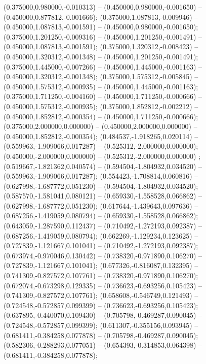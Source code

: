  (0.375000,0.980000,-0.010313) -- (0.450000,0.980000,-0.001650) -- (0.450000,0.877812,-0.001666);
 (0.375000,1.087813,-0.009946) -- (0.450000,1.087813,-0.001591) -- (0.450000,0.980000,-0.001650);
 (0.375000,1.201250,-0.009316) -- (0.450000,1.201250,-0.001491) -- (0.450000,1.087813,-0.001591);
 (0.375000,1.320312,-0.008423) -- (0.450000,1.320312,-0.001348) -- (0.450000,1.201250,-0.001491);
 (0.375000,1.445000,-0.007266) -- (0.450000,1.445000,-0.001163) -- (0.450000,1.320312,-0.001348);
 (0.375000,1.575312,-0.005845) -- (0.450000,1.575312,-0.000935) -- (0.450000,1.445000,-0.001163);
 (0.375000,1.711250,-0.004160) -- (0.450000,1.711250,-0.000666) -- (0.450000,1.575312,-0.000935);
 (0.375000,1.852812,-0.002212) -- (0.450000,1.852812,-0.000354) -- (0.450000,1.711250,-0.000666);
 (0.375000,2.000000,0.000000) -- (0.450000,2.000000,0.000000) -- (0.450000,1.852812,-0.000354);
 (0.484537,-1.918265,0.020114) -- (0.559963,-1.909066,0.017287) -- (0.525312,-2.000000,0.000000);
 (0.450000,-2.000000,0.000000) -- (0.525312,-2.000000,0.000000) ;
 (0.519667,-1.821362,0.040574) -- (0.594504,-1.804932,0.034520) -- (0.559963,-1.909066,0.017287);
 (0.554423,-1.708814,0.060816) -- (0.627998,-1.687772,0.051230) -- (0.594504,-1.804932,0.034520);
 (0.587570,-1.581041,0.080121) -- (0.659330,-1.558528,0.066862) -- (0.627998,-1.687772,0.051230);
 (0.617644,-1.439643,0.097636) -- (0.687256,-1.419059,0.080794) -- (0.659330,-1.558528,0.066862);
 (0.643059,-1.287590,0.112437) -- (0.710492,-1.272193,0.092387) -- (0.687256,-1.419059,0.080794);
 (0.662269,-1.129234,0.123625) -- (0.727839,-1.121667,0.101041) -- (0.710492,-1.272193,0.092387);
 (0.673974,-0.970046,0.130442) -- (0.738320,-0.971890,0.106270) -- (0.727839,-1.121667,0.101041);
 (0.677326,-0.816087,0.132395) -- (0.741309,-0.827572,0.107761) -- (0.738320,-0.971890,0.106270);
 (0.672074,-0.673298,0.129335) -- (0.736623,-0.693256,0.105423) -- (0.741309,-0.827572,0.107761);
 (0.658608,-0.546749,0.121493) -- (0.724548,-0.572857,0.099399) -- (0.736623,-0.693256,0.105423);
 (0.637895,-0.440070,0.109430) -- (0.705798,-0.469287,0.090045) -- (0.724548,-0.572857,0.099399);
 (0.611307,-0.355156,0.093945) -- (0.681411,-0.384258,0.077878) -- (0.705798,-0.469287,0.090045);
 (0.582306,-0.288293,0.077051) -- (0.654393,-0.314853,0.064398) -- (0.681411,-0.384258,0.077878);
